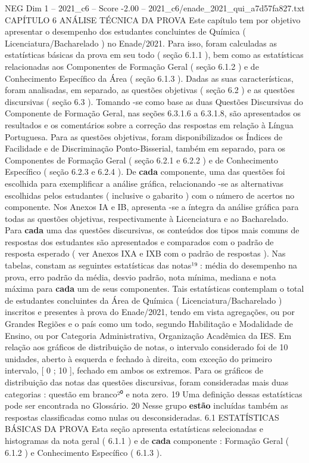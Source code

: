 \begin{textsample}{NEG Dim 1 – 2021\_c6 – Score -2.00 – 2021\_c6/enade\_2021\_qui\_a7d57fa827.txt}  \label{ex:f1_neg_238}
CAPÍTULO 6 ANÁLISE TÉCNICA DA PROVA Este capítulo tem por objetivo apresentar o desempenho dos estudantes concluintes de Química ( Licenciatura/Bacharelado ) no Enade/2021.
Para isso, foram calculadas as estatísticas básicas da prova em seu todo ( seção 6.1.1 ), bem como as estatísticas relacionadas aos Componentes de Formação Geral ( seção 6.1.2 ) e de Conhecimento Específico da Área ( seção 6.1.3 ).
Dadas as suas características, foram analisadas, em separado, as questões objetivas ( seção 6.2 ) e as questões discursivas ( seção 6.3 ).
Tomando -se como base as duas Questões Discursivas do Componente de Formação Geral, nas seções 6.3.1.6 a 6.3.1.8, são apresentados os resultados e os comentários sobre a correção das respostas em relação à Língua Portuguesa.
Para as questões objetivas, foram disponibilizados os Índices de Facilidade e de Discriminação Ponto-Bisserial, também em separado, para os Componentes de Formação Geral ( seção 6.2.1 e 6.2.2 ) e de Conhecimento Específico ( seção 6.2.3 e 6.2.4 ).
De \textbf{cada} componente, uma das questões foi escolhida para exemplificar a análise gráfica, relacionando -se as alternativas escolhidas pelos estudantes ( inclusive o gabarito ) com o número de acertos no componente.
Nos Anexos IA e IB, apresenta -se a íntegra da análise gráfica para todas as questões objetivas, respectivamente à Licenciatura e ao Bacharelado.
Para \textbf{cada} uma das questões discursivas, os conteúdos dos tipos mais comuns de respostas dos estudantes são apresentados e comparados com o padrão de resposta esperado ( ver Anexos IXA e IXB com o padrão de respostas ).
Nas tabelas, constam as seguintes estatísticas das notas¹⁹ : média do desempenho na prova, erro padrão da média, desvio padrão, nota mínima, mediana e nota máxima para \textbf{cada} um de seus componentes.
Tais estatísticas contemplam o total de estudantes concluintes da Área de Química ( Licenciatura/Bacharelado ) inscritos e presentes à prova do Enade/2021, tendo em vista agregações, ou por Grandes Regiões e o país como um todo, segundo Habilitação e Modalidade de Ensino, ou por Categoria Administrativa, Organização Acadêmica da IES.
Em relação aos gráficos de distribuição de notas, o intervalo considerado foi de 10 unidades, aberto à esquerda e fechado à direita, com exceção do primeiro intervalo, [ 0 ; 10 ], fechado em ambos os extremos.
Para os gráficos de distribuição das notas das questões discursivas, foram consideradas mais duas categorias : questão em branco²⁰ e nota zero. 19 Uma definição dessas estatísticas pode ser encontrada no Glossário. 20 Nesse grupo \textbf{estão} incluídas também as respostas classificadas como nulas ou desconsideradas. 6.1 ESTATÍSTICAS BÁSICAS DA PROVA Esta seção apresenta estatísticas selecionadas e histogramas da nota geral ( 6.1.1 ) e de \textbf{cada} componente : Formação Geral ( 6.1.2 ) e Conhecimento Específico ( 6.1.3 ).

\end{textsample}
